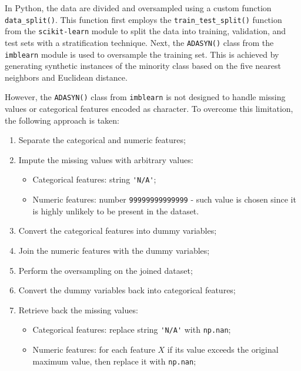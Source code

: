 In Python, the data are divided and oversampled using a custom function \lstinline{data_split()}.
This function first employs the \lstinline{train_test_split()} function from the \lstinline{scikit-learn} module to split the data into training, validation, and test sets with a stratification technique.
Next, the \lstinline{ADASYN()} class from the \lstinline{imblearn} module is used to oversample the training set. This is achieved by generating synthetic instances of the minority class based on the five nearest neighbors and Euclidean distance.

However, the \lstinline{ADASYN()} class from \lstinline{imblearn} is not designed to handle missing values or categorical features encoded as character. To overcome this limitation, the following approach is taken:
\begin{enumerate}\setlength\itemsep{0em} 
\item Separate the categorical and numeric features;
\item Impute the missing values with arbitrary values:
\begin{itemize}
\item Categorical features: string \lstinline{'N/A'};
\item Numeric features: number \lstinline{99999999999999} - such value is chosen since it is highly unlikely to be present in the dataset.
\end{itemize}
\item Convert the categorical features into dummy variables;
\item Join the numeric features with the dummy variables;
\item Perform the oversampling on the joined dataset;
\item Convert the dummy variables back into categorical features;
\item Retrieve back the missing values:
\begin{itemize}
\item Categorical features: replace string \lstinline{'N/A'} with \lstinline{np.nan};
\item Numeric features: for each feature $X$ if its value exceeds the original maximum value, then replace it with \lstinline{np.nan};
\end{itemize}
\end{enumerate}


